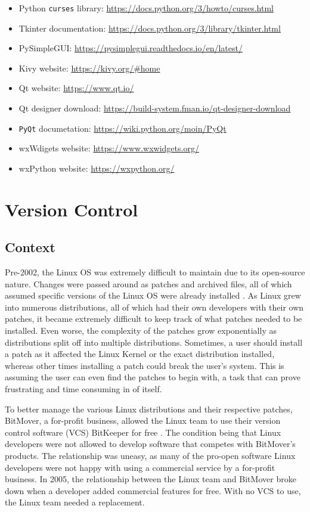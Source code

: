 \documentclass[11pt]{article}
\begin{document}
\begin{itemize}
    \item Python \texttt{curses} library: \url{https://docs.python.org/3/howto/curses.html}
    \item Tkinter documentation: \url{https://docs.python.org/3/library/tkinter.html}
    \item PySimpleGUI: \url{https://pysimplegui.readthedocs.io/en/latest/}
    \item Kivy website: \url{https://kivy.org/#home}
    \item Qt website: \url{https://www.qt.io/}
    \item Qt designer download: \url{https://build-system.fman.io/qt-designer-download}
    \item \texttt{PyQt} documetation: \url{https://wiki.python.org/moin/PyQt}
    \item wxWdigets website: \url{https://www.wxwidgets.org/}
    \item wxPython website: \url{https://wxpython.org/}
\end{itemize}

\newpage

\section{Version Control}

\subsection{Context}

Pre-2002, the Linux OS was extremely difficult to maintain due to its open-source nature. Changes were passed around as patches and archived files, all of which assumed specific versions of the Linux OS were already installed \cite{git-short-history}. As Linux grew into numerous distributions, all of which had their own developers with their own patches, it became extremely difficult to keep track of what patches needed to be installed. Even worse, the complexity of the patches grow exponentially as distributions split off into multiple distributions. Sometimes, a user should install a patch as it affected the Linux Kernel or the exact distribution installed, whereas other times installing a patch could break the user's system. This is assuming the user can even find the patches to begin with, a task that can prove frustrating and time consuming in of itself.

To better manage the various Linux distributions and their respective patches, BitMover, a for-profit business, allowed the Linux team to use their version control software (VCS) BitKeeper for free \cite{git-short-history}. The condition being that Linux developers were not allowed to develop software that competes with BitMover's products. The relationship was uneasy, as many of the pro-open software Linux developers were not happy with using a commercial service by a for-profit business. In 2005, the relationship between the Linux team and BitMover broke down when a developer added commercial features for free. With no VCS to use, the Linux team needed a replacement.
\end{document}
